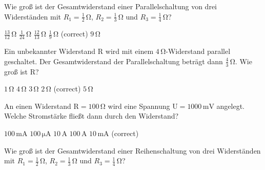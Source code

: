 \documentclass[11pt]{exam}
\begin{document}
\setlength{\voffset}{-0.5in}
\setlength{\headsep}{5pt}

\hspace{2mm}
 \hspace{5mm}
\vspace{4mm}

\begin{questions}

\question Wie groß ist der Gesamtwiderstand einer Parallelschaltung von drei Widerständen mit \(R_1=\mathrm{\frac{1}{2}\,\Omega}\), \(R_2=\mathrm{\frac{1}{3}\,\Omega}\) und \(R_3=\mathrm{\frac{1}{4}\,\Omega}\)?

\begin{choices}
	\choice \(\mathrm{\frac{13}{12}\,\Omega}\)
	\choice \(\mathrm{\frac{1}{24}\,\Omega}\)
	\choice \(\mathrm{\frac{12}{13}\,\Omega}\)
	\choice \(\mathrm{\frac{1}{9}\,\Omega}\) (correct)
	\choice \(\mathrm{9\,\Omega}\)
\end{choices}

\vspace{3mm}\question Ein unbekannter Widerstand \(\mathrm{R}\) wird mit einem \(\mathrm{4\,\Omega}\)-Widerstand parallel geschaltet. Der Gesamtwiderstand der Parallelschaltung beträgt dann \(\mathrm{\frac{4}{3}\,\Omega}\). Wie groß ist \(\mathrm{R}\)?

\begin{choices}
	\choice \(\mathrm{1\,\Omega}\)
	\choice \(\mathrm{4\,\Omega}\)
	\choice \(\mathrm{3\,\Omega}\)
	\choice \(\mathrm{2\,\Omega}\) (correct)
	\choice \(\mathrm{5\,\Omega}\)
\end{choices}

\vspace{3mm}\question An einen Widerstand \(\mathrm{R=100\,\Omega}\) wird eine Spannung \(\mathrm{U=1000\,mV}\) angelegt. Welche Stromstärke fließt dann durch den Widerstand?

\begin{choices}
	\choice \(\mathrm{100\,mA}\)
	\choice \(\mathrm{100\,\mu A}\)
	\choice \(\mathrm{10\,A}\)
	\choice \(\mathrm{100\,A}\)
	\choice \(\mathrm{10\,mA}\) (correct)
\end{choices}

\vspace{3mm}\question Wie groß ist der Gesamtwiderstand einer Reihenschaltung von drei Widerständen mit \(R_1=\mathrm{\frac{1}{2}\,\Omega}\), \(R_2=\mathrm{\frac{1}{3}\,\Omega}\) und \(R_3=\mathrm{\frac{1}{4}\,\Omega}\)?


\end{questions}
\end{document}
